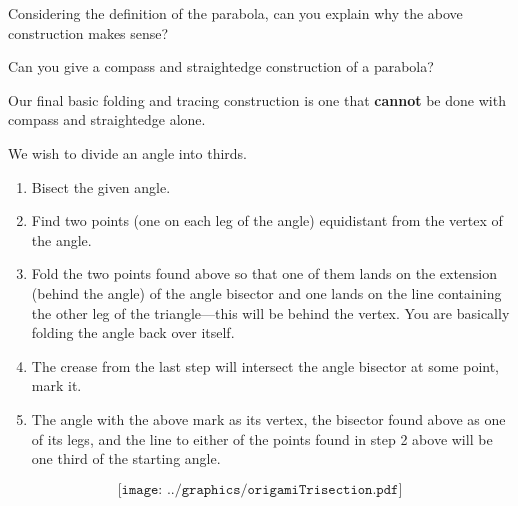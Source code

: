 \begin{question} 
Considering the definition of the parabola, can you explain why the
above construction makes sense?
\end{question}
\QM

\begin{question} Can you give a compass and straightedge construction of a parabola?
\end{question}
\QM

Our final basic folding and tracing construction is one that \textbf{cannot} be
done with compass and straightedge alone.



\begin{construction}
We wish to divide an angle into thirds.
\begin{enumerate}
\item Bisect the given angle.
\item Find two points (one on each leg of the angle) equidistant from the vertex of the angle.
\item Fold the two points found above so that one of them lands on the
  extension (behind the angle) of the angle bisector and one lands on
  the line containing the other leg of the triangle---this will be
  behind the vertex. You are basically folding the angle back over
  itself.
\item The crease from the last step will intersect the angle bisector
  at some point, mark it.
\item The angle with the above mark as its vertex, the bisector found
  above as one of its legs, and the line to either of the points found
  in step 2 above will be one third of the starting angle.
\end{enumerate}
\[
\texttt{[image: ../graphics/origamiTrisection.pdf]}
\]
\end{construction}


